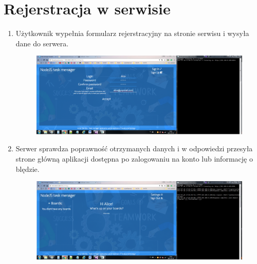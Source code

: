 \documentclass[12pt]{report}
\begin{document}
\section{Rejerstracja w serwisie}
\begin{enumerate}
\item Użytkownik wypełnia formularz rejerstracyjny na stronie serwisu i wysyła dane do serwera. 
\begin{figure}[h]
\centering
\includegraphics[width=\textwidth,height=\textheight,keepaspectratio]{21.png}
\end{figure}
\item Serwer sprawdza poprawność otrzymanych danych i w odpowiedzi przesyła strone główną aplikacji dostępna po zalogowaniu na konto lub informację o blędzie.
\begin{figure}[h]
\centering
\includegraphics[width=\textwidth,height=\textheight,keepaspectratio]{22.png}
\end{figure}
\end{enumerate}
\end{document}
